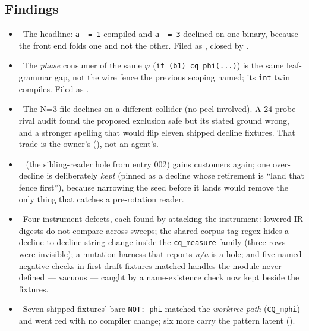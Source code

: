 \subsection*{Findings}
\begin{itemize}
  \item \foverdecline\ The headline: \texttt{a -= 1} compiled and \texttt{a -= 3} declined on one binary,
    because the front end folds one and not the other. Filed as , closed by .
  \item \foverdecline\ The \emph{phase} consumer of the same \(\varphi\) (\texttt{if (b1) cq\_phi(...)})
    is the same leaf-grammar gap, not the wire fence the previous scoping named; its \texttt{int} twin
    compiles. Filed as .
  \item \fdoc\ The N=3 file declines on a different collider (no peel involved). A 24-probe rival audit
    found the proposed exclusion safe but its stated ground wrong, and a stronger spelling that would flip
    eleven shipped decline fixtures. That trade is the owner's (), not an agent's.
  \item \fpreexisting\  (the sibling-reader hole from entry 002) gains customers again; one
    over-decline is deliberately \emph{kept} (pinned as a decline whose retirement is ``land that fence
    first''), because narrowing the seed before it lands would remove the only thing that catches a
    pre-rotation reader.
  \item \fdoc\ Four instrument defects, each found by attacking the instrument: lowered-IR digests do not
    compare across sweeps; the shared corpus tag regex hides a decline-to-decline string change inside the
    \texttt{cq\_measure} family (three rows were invisible); a mutation harness that reports \emph{n/a} is
    a hole; and five named negative checks in first-draft fixtures matched handles the module never
    defined --- vacuous --- caught by a name-existence check now kept beside the fixtures.
  \item \fdoc\ Seven shipped fixtures' bare \texttt{NOT: phi} matched the \emph{worktree path}
    (\texttt{CQ\_mphi}) and went red with no compiler change; six more carry the pattern latent
    ().
\end{itemize}

